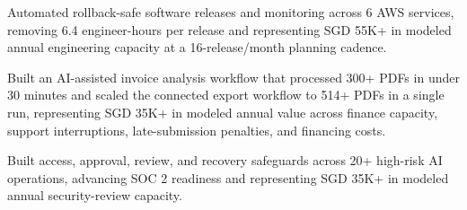\documentclass[letterpaper,10pt]{article}
\newcommand{\resumeItem}[1]{
  \item\small{
    {#1 \vspace{-2pt}}
  }
}
\begin{document}
        \resumeItem{Automated rollback-safe software releases and monitoring across 6 AWS services, removing 6.4 engineer-hours per release and representing SGD 55K+ in modeled annual engineering capacity at a 16-release/month planning cadence.}
        \resumeItem{Built an AI-assisted invoice analysis workflow that processed 300+ PDFs in under 30 minutes and scaled the connected export workflow to 514+ PDFs in a single run, representing SGD 35K+ in modeled annual value across finance capacity, support interruptions, late-submission penalties, and financing costs.}
        \resumeItem{Built access, approval, review, and recovery safeguards across 20+ high-risk AI operations, advancing SOC 2 readiness and representing SGD 35K+ in modeled annual security-review capacity.}
\end{document}
